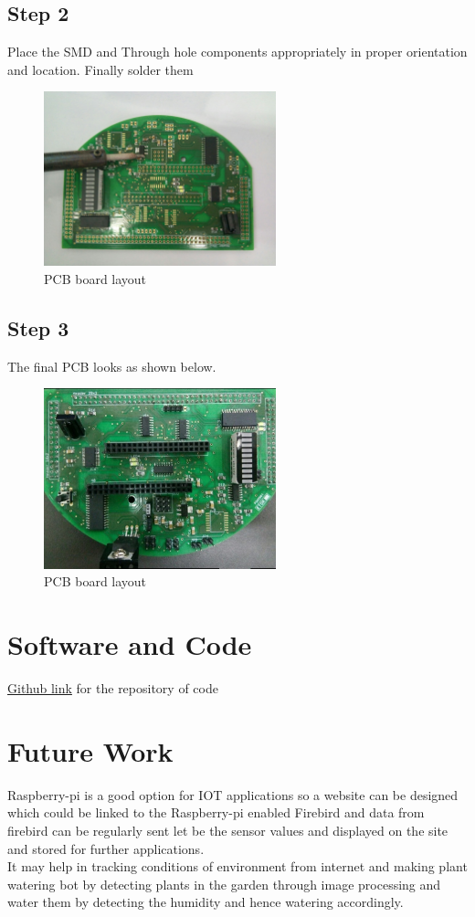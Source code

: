 \documentclass[a4paper,12pt,oneside]{book}
\begin{document}
\subsection*{Step 2}
Place the SMD and Through hole components appropriately in proper orientation and location. Finally solder them
\begin{figure}[!ht]
	\hspace{3cm}
	\includegraphics[width=0.6\textwidth]{plain_pcb}
	\caption{PCB board layout }
\end{figure}
\subsection*{Step 3}
The final PCB looks as shown below.
\begin{figure}[!ht]
	\hspace{3cm}
	\includegraphics[width=0.6\textwidth]{PCB}
	\caption{PCB board layout }
\end{figure}
	
	\section{Software and Code}
	\href{https://github.com/eYSIP-2017/eYSIP-2017_Fi_Pi/tree/master/codes/Experiments}{Github link} for the repository of code

	\section{Future Work}
	Raspberry-pi is a good option for IOT applications so a website can be designed which could be linked to the Raspberry-pi enabled Firebird and data from firebird can be regularly sent let be the sensor values and displayed on the site and stored for further applications.\\
	It may help in tracking conditions of environment from internet and making plant watering bot by detecting plants in the garden through image processing and water them by detecting the humidity and hence watering accordingly. 
	\pagebreak
\end{document}
